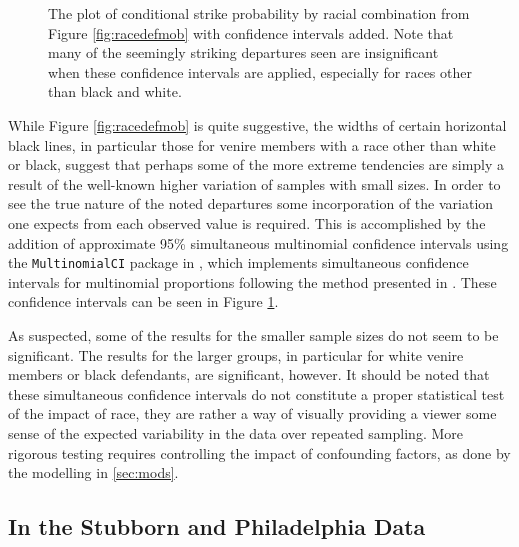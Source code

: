 \begin{figure}[h!]
  \centering
  \caption[Strikes by Racial Combination with Confidence
  Intervals (Sunsine)]{\footnotesize The plot of conditional strike probability by racial
    combination from Figure \ref{fig:racedefmob} with confidence intervals added. Note that many of the seemingly striking departures seen are
    insignificant when these confidence intervals are applied,
    especially for races other than black and white.}
  \label{fig:racedefci}
\end{figure}

While Figure \ref{fig:racedefmob} is quite suggestive, the widths of certain horizontal black lines, in particular those for
venire members with a race other than white or black, suggest that perhaps some of the more extreme tendencies are simply a result
of the well-known higher variation of samples with small sizes. In order to see the true nature of the noted departures some
incorporation of the variation one expects from each observed value is required. This is accomplished by the addition of
approximate 95\%  simultaneous multinomial confidence intervals using the \texttt{MultinomialCI} package in \Rp, which implements
simultaneous confidence intervals for multinomial proportions following the method presented in \cite{sison1995}. These confidence
intervals can be seen in Figure \ref{fig:racedefci}.

As suspected, some of the results for the smaller sample sizes do not seem to be significant. The results for the larger groups,
in particular for white venire members or black defendants, are significant, however. It should be noted that these simultaneous
confidence intervals do not constitute a proper statistical test of the impact of race, they are rather a way of visually
providing a viewer some sense of the expected variability in the data over repeated sampling. More rigorous testing requires
controlling the impact of confounding factors, as done by the modelling in \ref{sec:mods}.

\subsection{In the Stubborn and Philadelphia Data}


